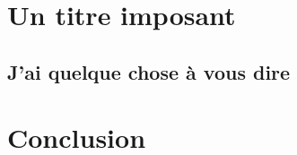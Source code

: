 \documentclass[a4paper,10pt]{report}
\renewcommand{\chaptermark}[1]{\markboth{\chaptername~\thechapter{} : #1}{}}
\renewcommand{\sectionmark}[1]{\markright{\thesection{} \ #1}}
\renewcommand{\headrulewidth}{0.2pt}
\renewcommand{\headrulewidth}{0pt}%
\newcommand\skippage{%
    \null
    \newpage}
\begin{document}
\clearpage
\thispagestyle{empty}
\skippage %




\clearpage
\thispagestyle{empty}
\skippage %

\part{Un titre imposant}
\label{part2:}


\clearpage
\thispagestyle{empty}
\skippage %

\chapter{J'ai quelque chose à vous dire}
\label{part2:chap1:monPremierChapitre}



\part*{Conclusion}
\label{part3:}



\clearpage
\thispagestyle{empty}
\skippage %



\clearpage


%   
 

\renewcommand{\chaptermark}[1]{\markboth{#1}{}}
\renewcommand{\sectionmark}[1]{\markright{#1}}
\pagestyle{fancy}
\fancyhf{}
\fancyfoot[R]{\ifthenelse{\isodd{\value{page}}}{\thepage}{}}
\fancyfoot[L]{\ifthenelse{\isodd{\value{page}}}{}{\thepage}}




\clearpage

\thispagestyle{empty}
\vspace{-10cm}

\end{document}
